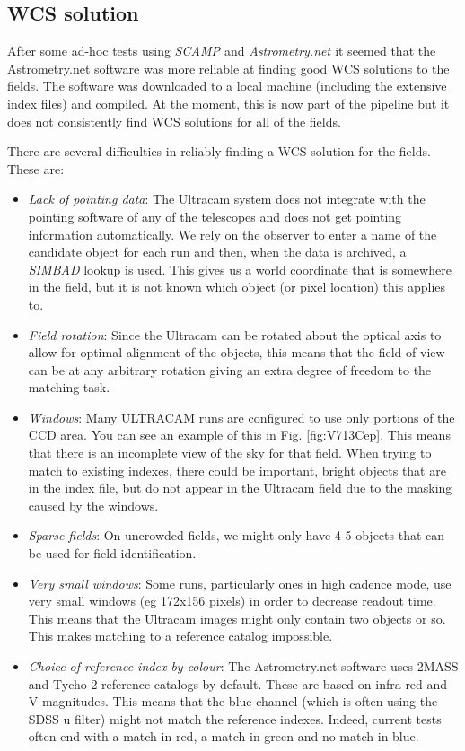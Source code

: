 \subsection{WCS solution}
After some ad-hoc tests using \emph{SCAMP \cite{scamp}} and \emph{Astrometry.net \cite{astrometry}} it seemed that the Astrometry.net software was more reliable at finding good WCS solutions to the fields. The software was downloaded to a local machine (including the extensive index files) and compiled. At the moment, this is now part of the pipeline but it does not consistently find WCS solutions for all of the fields. 

There are several difficulties in reliably finding a WCS solution for the fields.  These are:
\begin{itemize}
	\item \emph{Lack of pointing data}: The Ultracam system does not integrate with the pointing software of any of the telescopes and does not get pointing information automatically. We rely on the observer to enter a name of the candidate object for each run and then, when the data is archived, a \emph{SIMBAD} lookup is used. This gives us a world coordinate that is somewhere in the field, but it is not known which object (or pixel location) this applies to.  
	\item \emph{Field rotation}: Since the Ultracam can be rotated about the optical axis to allow for optimal alignment of the objects, this means that the field of view can be at any arbitrary rotation giving an extra degree of freedom to the matching task. 
	\item \emph{Windows}: Many ULTRACAM runs are configured to use only portions of the CCD area. You can see an example of this in Fig.  \ref{fig:V713Cep}. This means that there is an incomplete view of the sky for that field. When trying to match to existing indexes, there could be important, bright objects that are in the index file, but do not appear in the Ultracam field due to the masking caused by the windows.
	\item \emph{Sparse fields}: On uncrowded fields, we might only have 4-5 objects that can be used for field identification. 
	\item \emph{Very small windows}: Some runs, particularly ones in high cadence mode, use very small windows (eg 172x156 pixels) in order to decrease readout time. This means that the Ultracam images might only contain two objects or so. This makes matching to a reference catalog impossible. 
	\item \emph{Choice of reference index by colour}: The Astrometry.net software uses 2MASS and Tycho-2 reference catalogs by default. These are based on infra-red and V magnitudes. This means that the blue channel (which is often using the SDSS u filter) might not match the reference indexes. Indeed, current tests often end with a match in red, a match in green and no match in blue. 
\end{itemize}

